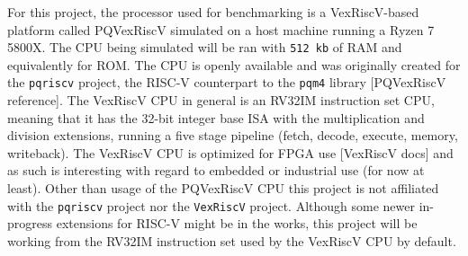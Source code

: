 For this project, the processor used for benchmarking is a VexRiscV-based platform called PQVexRiscV simulated on a host machine running a Ryzen 7 5800X. The CPU being simulated will be ran with \texttt{512 kb} of RAM and equivalently for ROM. The CPU is openly available and was originally created for the \texttt{pqriscv} project, the RISC-V counterpart to the \texttt{pqm4} library [PQVexRiscV reference]. The VexRiscV CPU in general is an RV32IM instruction set CPU, meaning that it has the 32-bit integer base ISA with the multiplication and division extensions, running a five stage pipeline (fetch, decode, execute, memory, writeback). The VexRiscV CPU is optimized for FPGA use [VexRiscV docs] and as such is interesting with regard to embedded or industrial use (for now at least). Other than usage of the PQVexRiscV CPU this project is not affiliated with the \texttt{pqriscv} project nor the \texttt{VexRiscV} project. Although some newer in-progress extensions for RISC-V might be in the works, this project will be working from the RV32IM instruction set used by the VexRiscV CPU by default.\medskip\\
